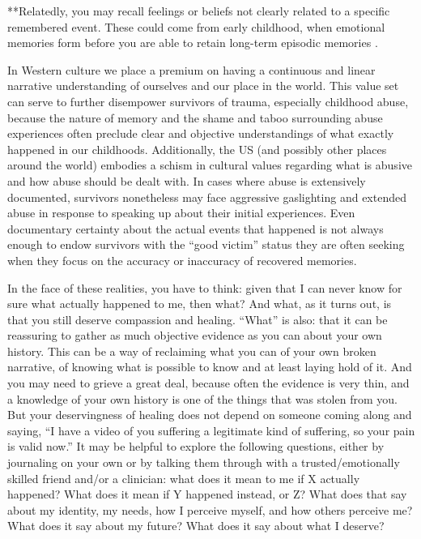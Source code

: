 \documentclass[12pt,letterpaper]{book}
\begin{document}
**Relatedly, you may recall feelings or beliefs not clearly related to a specific remembered event. These could come from early childhood, when emotional memories form before you are able to retain long-term episodic memories \cite{brownAttachmentDisturbances}.

In Western  culture we place a premium on having a continuous and linear narrative understanding of ourselves and our place in the world. This value set can serve to further disempower survivors of trauma, especially childhood abuse, because the nature of memory and the shame and taboo surrounding abuse experiences often preclude clear and objective understandings of what exactly happened in our childhoods. Additionally, the US (and possibly other places around the world) embodies a schism in cultural values regarding what is abusive and how abuse should be dealt with. In cases where abuse is extensively documented, survivors nonetheless may face aggressive gaslighting and extended abuse in response to speaking up about their initial experiences. Even documentary certainty about the actual events that happened is not always enough to endow survivors with the “good victim” status they are often seeking when they focus on the accuracy or inaccuracy of recovered memories.

In the face of these realities, you have to think: given that I can never know for sure what actually happened to me, then what? And what, as it turns out, is that you still deserve compassion and healing. “What” is also: that it can be reassuring to gather as much objective evidence as you can about your own history. This can be a way of reclaiming what you can of your own broken narrative, of knowing what is possible to know and at least laying hold of it. And you may need to grieve a great deal, because often the evidence is very thin, and a knowledge of your own history is one of the things that was stolen from you. But your deservingness of healing does not depend on someone coming along and saying, “I have a video of you suffering a legitimate kind of suffering, so your pain is valid now.” It may be helpful to explore the following questions, either by journaling on your own or by talking them through with a trusted/emotionally skilled friend and/or a clinician: what does it mean to me if X actually happened? What does it mean if Y happened instead, or Z? What does that say about my identity, my needs, how I perceive myself, and how others perceive me? What does it say about my future? What does it say about what I deserve?
\end{document}
